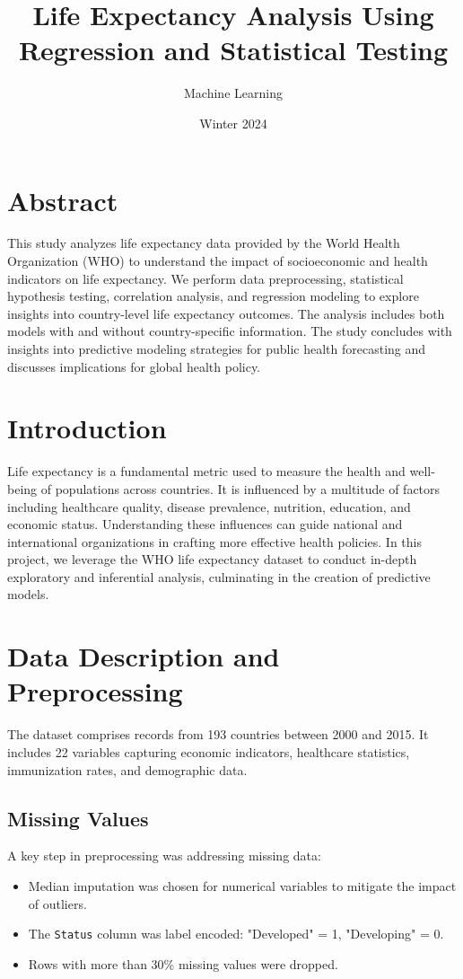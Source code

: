 \documentclass[11pt]{article}
\title{\textbf{Life Expectancy Analysis Using Regression and Statistical Testing}}
\author{Machine Learning}
\date{Winter 2024}
\begin{document}
\maketitle

\section*{Abstract}
This study analyzes life expectancy data provided by the World Health Organization (WHO) to understand the impact of socioeconomic and health indicators on life expectancy. We perform data preprocessing, statistical hypothesis testing, correlation analysis, and regression modeling to explore insights into country-level life expectancy outcomes. The analysis includes both models with and without country-specific information. The study concludes with insights into predictive modeling strategies for public health forecasting and discusses implications for global health policy.

\section{Introduction}
Life expectancy is a fundamental metric used to measure the health and well-being of populations across countries. It is influenced by a multitude of factors including healthcare quality, disease prevalence, nutrition, education, and economic status. Understanding these influences can guide national and international organizations in crafting more effective health policies. In this project, we leverage the WHO life expectancy dataset to conduct in-depth exploratory and inferential analysis, culminating in the creation of predictive models.

\section{Data Description and Preprocessing}
The dataset comprises records from 193 countries between 2000 and 2015. It includes 22 variables capturing economic indicators, healthcare statistics, immunization rates, and demographic data.

\subsection{Missing Values}
A key step in preprocessing was addressing missing data:
\begin{itemize}
    \item Median imputation was chosen for numerical variables to mitigate the impact of outliers.
    \item The \texttt{Status} column was label encoded: "Developed" = 1, "Developing" = 0.
    \item Rows with more than 30\% missing values were dropped.
\end{itemize}
\end{document}

